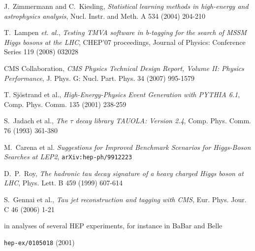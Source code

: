 \documentclass[a4paper]{jpconf}
\begin{document}
\begin{thebibliography}{9}


 J.~Zimmermann and C.~Kiesling,
\emph{Statistical learning methods in high-energy and astrophysics analysis},
Nucl. Instr. and Meth. A 534 (2004) 204-210

 T.~Lampen {\em et. al.}, \emph{Testing TMVA software in b-tagging 
                  for the search of MSSM Higgs bosons at the LHC},
CHEP’07 proceedings, Journal of Physics: Conference Series 119 (2008) 032028

 {CMS Collaboration}, \emph{{CMS} Physics Technical Design Report, Volume {II}:
             Physics Performance}, J. Phys. G: Nucl. Part. Phys. 34 (2007) 995-1579

 T. Sj\"ostrand et al., \emph{High-Energy-Physics
  Event Generation with {PYTHIA} 6.1}, Comp. Phys. Comm. 135 (2001) 238-259

 S.~Jadach et al., \emph{The $\tau$ decay library
  {TAUOLA}: Version 2.4}, Comp. Phys. Comm. 76 (1993) 361-380

 M.~Carena et al. \emph{Suggestions for Improved Benchmark Scenarios for Higgs-Boson Searches at LEP2}, 
{\tt arXiv:hep-ph/9912223} %

 D.~P.~Roy, \emph{The hadronic tau decay signature of a heavy charged Higgs
              boson at {LHC}}, Phys. Lett. B 459 (1999) 607-614

 S.~Gennai et al., \emph{Tau jet reconstruction
  and tagging with {CMS}}, Eur. Phys. Jour. C 46 (2006) 1-21


 in analyses of several HEP experiments, for instance in BaBar \cite{fisherbabar} and
Belle \cite{fisherbelle}

 {\tt hep-ex/0105018} (2001)


\end{thebibliography}
\end{document}
